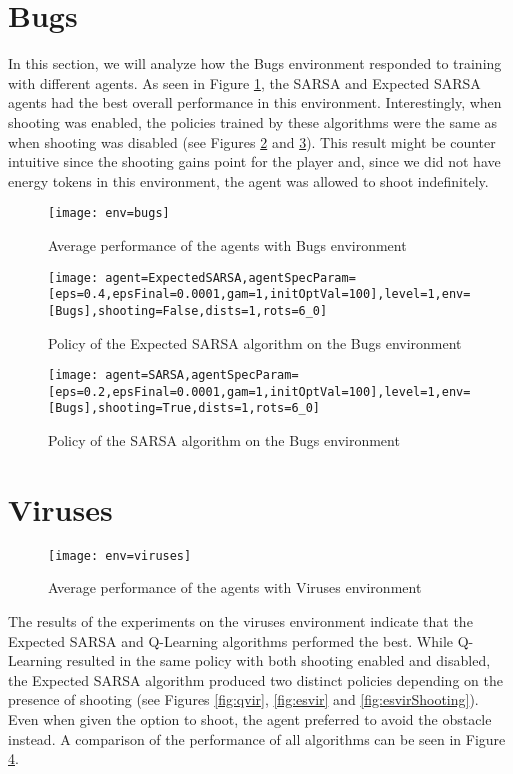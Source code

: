 \section{Bugs}
In this section, we will analyze how the Bugs environment responded to training with different agents. As seen in Figure \ref{fig:avgbugs}, the SARSA and Expected SARSA agents had the best overall performance in this environment. Interestingly, when shooting was enabled, the policies trained by these algorithms were the same as when shooting was disabled (see Figures \ref{fig:polexps} and \ref{fig:pols}). This result might be counter intuitive since the shooting gains point for the player and, since we did not have energy tokens in this environment, the agent was allowed to shoot indefinitely.

\begin{figure}[h]
    \centering
    \texttt{[image: env=bugs]}
    \caption{Average performance of the agents with Bugs environment}
    \label{fig:avgbugs}
\end{figure}

\begin{figure}[h]
    \centering
    \texttt{[image: agent=ExpectedSARSA,agentSpecParam=[eps=0.4,epsFinal=0.0001,gam=1,initOptVal=100],level=1,env=[Bugs],shooting=False,dists=1,rots=6\_0]}
    \caption{Policy of the Expected SARSA algorithm on the Bugs environment}
    \label{fig:polexps}
\end{figure}

\begin{figure}[h]
    \centering
    \texttt{[image: agent=SARSA,agentSpecParam=[eps=0.2,epsFinal=0.0001,gam=1,initOptVal=100],level=1,env=[Bugs],shooting=True,dists=1,rots=6\_0]}
    \caption{Policy of the SARSA algorithm on the Bugs environment}
    \label{fig:pols}
\end{figure}

\section{Viruses}

\begin{figure}[h]
    \centering
    \texttt{[image: env=viruses]}
    \caption{Average performance of the agents with Viruses environment}
    \label{fig:avgviruses}
\end{figure}

The results of the experiments on the viruses environment indicate that the Expected SARSA and Q-Learning algorithms performed the best. While Q-Learning resulted in the same policy with both shooting enabled and disabled, the Expected SARSA algorithm produced two distinct policies depending on the presence of shooting (see Figures \ref{fig:qvir}, \ref{fig:esvir} and \ref{fig:esvirShooting}). Even when given the option to shoot, the agent preferred to avoid the obstacle instead. A comparison of the performance of all algorithms can be seen in Figure \ref{fig:avgviruses}.


